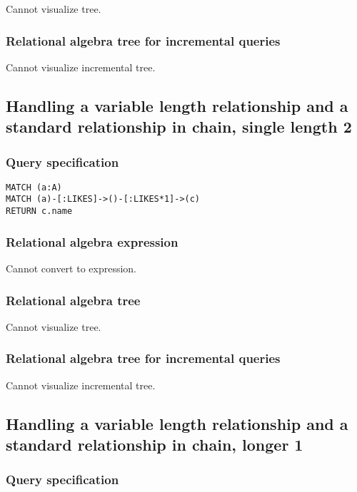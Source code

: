 Cannot visualize tree.

\subsubsection*{Relational algebra tree for incremental queries}

Cannot visualize incremental tree.

\subsection{Handling a variable length relationship and a standard relationship in chain, single length 2}

\subsubsection*{Query specification}

\begin{lstlisting}
MATCH (a:A)
MATCH (a)-[:LIKES]->()-[:LIKES*1]->(c)
RETURN c.name
\end{lstlisting}

\subsubsection*{Relational algebra expression}

Cannot convert to expression.

\subsubsection*{Relational algebra tree}

Cannot visualize tree.

\subsubsection*{Relational algebra tree for incremental queries}

Cannot visualize incremental tree.

\subsection{Handling a variable length relationship and a standard relationship in chain, longer 1}

\subsubsection*{Query specification}

